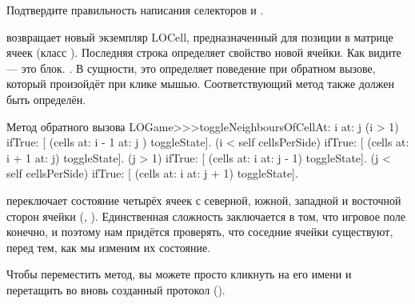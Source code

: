 \documentclass[a4paper,10pt,twoside]{book}
\begin{document}
Подтвердите правильность написания селекторов  и .

 возвращает новый экземпляр LOCell, предназначенный для позиции  в матрице ячеек (класс ).
Последняя строка определяет свойство  новой ячейки. Как видите --- это блок.
\mbox{.}
 В сущности, это определяет поведение при обратном вызове, который произойдёт при клике мышью.
Соответствующий метод также должен быть определён.

\begin{method}[toggleNeighboursOfCellAt:at:]{Метод обратного вызова}
LOGame>>>toggleNeighboursOfCellAt: i at: j
   (i > 1) ifTrue: [ (cells at: i - 1 at: j ) toggleState].
   (i < self cellsPerSide) ifTrue: [ (cells at: i + 1 at: j) toggleState].
   (j > 1) ifTrue: [ (cells at: i  at: j - 1) toggleState].
   (j < self cellsPerSide) ifTrue: [ (cells at: i at: j + 1) toggleState].
\end{method}

 переключает состояние четырёх ячеек с северной, южной, западной и восточной сторон ячейки (, ). Единственная сложность заключается в том, что игровое поле конечно, и поэтому нам придётся проверять, что соседние ячейки существуют, перед тем, как мы изменим их состояние.

Чтобы переместить метод, вы можете просто кликнуть на его имени и перетащить во вновь созданный протокол ().
\end{document}
